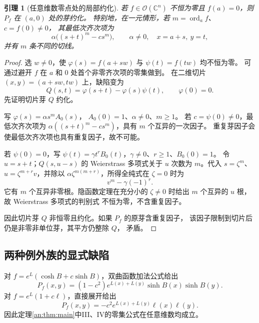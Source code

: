 \documentclass[11pt,a4paper,oneside,openany]{book}
\theoremstyle{lecture}
\newtheorem{lemma}[theorem]{引理}
\newcommand{\C}{\mathbb C}
\newcommand{\OO}{\mathcal O}
\newcommand{\ord}{\operatorname{ord}}
\numberwithin{equation}{section}
\begin{document}
\begin{lemma}[任意维数零点处的局部约化]\label{an:lem:local-reduced}
若 $f\in\OO(\C^n)$ 不恒为零且 $f(a)=0$，则 $P_f$ 在 $(a,0)$ 处的芽约化。
特别地，在一元情形，若 $m=\ord_a f$、$c=f(0)\ne0$，
其最低次齐次项为
\begin{equation}\label{an:eq:tangent}
 \alpha\bigl((s+t)^m-cs^m\bigr),\qquad \alpha\ne0,
 \quad x=a+s,\ y=t,
\end{equation}
并有 $m$ 条不同的切线。
\end{lemma}
\begin{proof}
选 $w\ne0$，使
$\varphi(s)=f(a+sw)$ 与 $\psi(t)=f(tw)$ 均不恒为零。
可通过避开 $f$ 在 $a$ 和 $0$ 处首个非零齐次项的零集做到。
在二维切片 $(x,y)=(a+sw,tw)$ 上，缺陷变为
\[
 Q(s,t)=\varphi(s+t)-\varphi(s)\psi(t),\qquad\varphi(0)=0.
\]
先证明切片芽 $Q$ 约化。

写 $\varphi(s)=\alpha s^m A_0(s)$，
$A_0(0)=1$、$\alpha\ne0$、$m\geq1$。
若 $c=\psi(0)\ne0$，最低次齐次项为
$\alpha((s+t)^m-cs^m)$，具有 $m$ 个互异的一次因子。
重复芽因子会使最低次齐次项也具有重复因子，故不可能。

若 $\psi(0)=0$，写
$\psi(t)=\gamma t^r B_0(t)$，$\gamma\ne0$、$r\geq1$、$B_0(0)=1$。
令 $u=s+t$；$Q(s,u-s)$ 的 Weierstrass 多项式关于 $u$
次数为 $m$。代入 $s=\zeta^m$、$u=\zeta^{m+r}v$，并除以
$\alpha\zeta^{m(m+r)}$，所得全纯式在 $\zeta=0$ 时为
\[
 v^m-\gamma(-1)^r.
\]
它有 $m$ 个互异非零根。隐函数定理在充分小的 $\zeta\ne0$
时给出 $m$ 个互异的 $u$ 根，故 Weierstrass 多项式的判别式
不恒为零，不含重复因子。

因此切片芽 $Q$ 非恒零且约化。如果 $P_f$ 的原芽含重复因子，
该因子限制到切片后仍是非零非单位芽，其平方仍整除 $Q$，
矛盾。
\end{proof}

\subsection{两种例外族的显式缺陷}
对 $f=e^L(\cosh B+c\sinh B)$，双曲函数加法公式给出
\begin{equation}\label{an:eq:twoexpdefect}
 P_f(x,y)=(1-c^2)e^{L(x)+L(y)}\sinh B(x)\sinh B(y).
\end{equation}
对 $f=e^L(1+c\ell)$，直接展开给出
\begin{equation}\label{an:eq:lineardefect}
 P_f(x,y)=-c^2e^{L(x)+L(y)}\ell(x)\ell(y).
\end{equation}
因此定理\ref{an:thm:main}中III、IV的零集公式在任意维数均成立。
\end{document}
